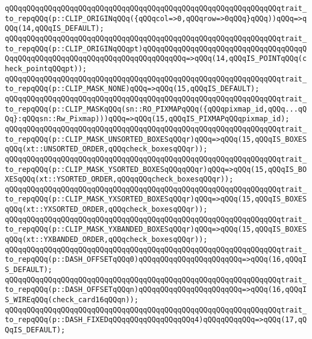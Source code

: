 \newline
\verb|qQQqqQQqqQQqqQQqqQQqqQQqqQQqqQQqqQQqqQQqqQQqqQQqqQQqqQQqqQQqqQQqtrait_to_repqQQq(p::CLIP_ORIGINqQQq({qQQqcol=>0,qQQqrow=>0qQQq}qQQq))qQQq=>qQQq(14,qQQqIS_DEFAULT);|\newline
\verb|qQQqqQQqqQQqqQQqqQQqqQQqqQQqqQQqqQQqqQQqqQQqqQQqqQQqqQQqqQQqqQQqtrait_to_repqQQq(p::CLIP_ORIGINqQQqpt)qQQqqQQqqQQqqQQqqQQqqQQqqQQqqQQqqQQqqQQqqQQqqQQqqQQqqQQqqQQqqQQqqQQqqQQqqQQqqQQq=>qQQq(14,qQQqIS_POINTqQQq(check_pointqQQqpt));|\newline
\newline
\verb|qQQqqQQqqQQqqQQqqQQqqQQqqQQqqQQqqQQqqQQqqQQqqQQqqQQqqQQqqQQqqQQqtrait_to_repqQQq(p::CLIP_MASK_NONE)qQQq=>qQQq(15,qQQqIS_DEFAULT);|\newline
\verb|qQQqqQQqqQQqqQQqqQQqqQQqqQQqqQQqqQQqqQQqqQQqqQQqqQQqqQQqqQQqqQQqtrait_to_repqQQq(p::CLIP_MASKqQQq(sn::RO_PIXMAPqQQq({qQQqpixmap_id,qQQq...qQQq}:qQQqsn::Rw_Pixmap)))qQQq=>qQQq(15,qQQqIS_PIXMAPqQQqpixmap_id);|\newline
\verb|qQQqqQQqqQQqqQQqqQQqqQQqqQQqqQQqqQQqqQQqqQQqqQQqqQQqqQQqqQQqqQQqtrait_to_repqQQq(p::CLIP_MASK_UNSORTED_BOXESqQQqr)qQQq=>qQQq(15,qQQqIS_BOXESqQQq(xt::UNSORTED_ORDER,qQQqcheck_boxesqQQqr));|\newline
\verb|qQQqqQQqqQQqqQQqqQQqqQQqqQQqqQQqqQQqqQQqqQQqqQQqqQQqqQQqqQQqqQQqtrait_to_repqQQq(p::CLIP_MASK_YSORTED_BOXESqQQqqQQqr)qQQq=>qQQq(15,qQQqIS_BOXESqQQq(xt::YSORTED_ORDER,qQQqqQQqcheck_boxesqQQqr));|\newline
\verb|qQQqqQQqqQQqqQQqqQQqqQQqqQQqqQQqqQQqqQQqqQQqqQQqqQQqqQQqqQQqqQQqtrait_to_repqQQq(p::CLIP_MASK_YXSORTED_BOXESqQQqr)qQQq=>qQQq(15,qQQqIS_BOXESqQQq(xt::YXSORTED_ORDER,qQQqcheck_boxesqQQqr));|\newline
\verb|qQQqqQQqqQQqqQQqqQQqqQQqqQQqqQQqqQQqqQQqqQQqqQQqqQQqqQQqqQQqqQQqtrait_to_repqQQq(p::CLIP_MASK_YXBANDED_BOXESqQQqr)qQQq=>qQQq(15,qQQqIS_BOXESqQQq(xt::YXBANDED_ORDER,qQQqcheck_boxesqQQqr));|\newline
\newline
\verb|qQQqqQQqqQQqqQQqqQQqqQQqqQQqqQQqqQQqqQQqqQQqqQQqqQQqqQQqqQQqqQQqtrait_to_repqQQq(p::DASH_OFFSETqQQq0)qQQqqQQqqQQqqQQqqQQqqQQq=>qQQq(16,qQQqIS_DEFAULT);|\newline
\verb|qQQqqQQqqQQqqQQqqQQqqQQqqQQqqQQqqQQqqQQqqQQqqQQqqQQqqQQqqQQqqQQqtrait_to_repqQQq(p::DASH_OFFSETqQQqn)qQQqqQQqqQQqqQQqqQQqqQQq=>qQQq(16,qQQqIS_WIREqQQq(check_card16qQQqn));|\newline
\newline
\verb|qQQqqQQqqQQqqQQqqQQqqQQqqQQqqQQqqQQqqQQqqQQqqQQqqQQqqQQqqQQqqQQqtrait_to_repqQQq(p::DASH_FIXEDqQQqqQQqqQQqqQQqqQQq4)qQQqqQQqqQQq=>qQQq(17,qQQqIS_DEFAULT);|\newline
